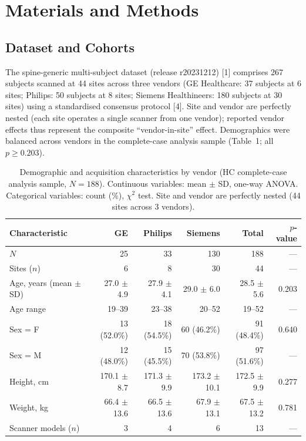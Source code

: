 \documentclass[12pt,a4paper]{article}
\begin{document}
\section{Materials and Methods}

\subsection{Dataset and Cohorts}

The spine-generic multi-subject dataset (release r20231212) [1] comprises 267 subjects scanned at 44 sites across three vendors (GE Healthcare: 37 subjects at 6 sites; Philips: 50 subjects at 8 sites; Siemens Healthineers: 180 subjects at 30 sites) using a standardised consensus protocol [4]. Site and vendor are perfectly nested (each site operates a single scanner from one vendor); reported vendor effects thus represent the composite ``vendor-in-site'' effect. Demographics were balanced across vendors in the complete-case analysis sample (Table~1; all $p\geq0.203$).

\begin{table}[H]
\centering
\small
\setlength{\tabcolsep}{4pt}
\caption{Demographic and acquisition characteristics by vendor (HC complete-case analysis sample, $N=188$). Continuous variables: mean $\pm$ SD, one-way ANOVA. Categorical variables: count (\%), $\chi^{2}$ test. Site and vendor are perfectly nested (44 sites across 3 vendors).}
\label{tab:demographics}
\begin{tabular}{lrrrrr}
\toprule
Characteristic & GE & Philips & Siemens & Total & $p$-value \\
\midrule
$N$ & 25 & 33 & 130 & 188 & --- \\
Sites ($n$) & 6 & 8 & 30 & 44 & --- \\
Age, years (mean $\pm$ SD) & 27.0 $\pm$ 4.9 & 27.9 $\pm$ 4.1 & 29.0 $\pm$ 6.0 & 28.5 $\pm$ 5.6 & 0.203 \\
Age range & 19--39 & 23--38 & 20--52 & 19--52 & --- \\
Sex = F & 13 (52.0\%) & 18 (54.5\%) & 60 (46.2\%) & 91 (48.4\%) & 0.640 \\
Sex = M & 12 (48.0\%) & 15 (45.5\%) & 70 (53.8\%) & 97 (51.6\%) & --- \\
Height, cm & 170.1 $\pm$ 8.7 & 171.3 $\pm$ 9.9 & 173.2 $\pm$ 10.1 & 172.5 $\pm$ 9.9 & 0.277 \\
Weight, kg & 66.4 $\pm$ 13.6 & 66.5 $\pm$ 13.6 & 67.9 $\pm$ 13.1 & 67.5 $\pm$ 13.2 & 0.781 \\
Scanner models ($n$) & 3 & 4 & 6 & 13 & --- \\
\bottomrule
\end{tabular}
\end{table}
\end{document}

